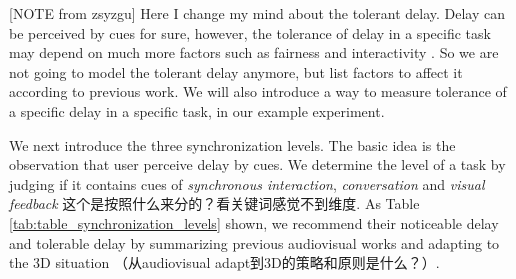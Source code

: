 [NOTE from zsyzgu] Here I change my mind about the tolerant delay. Delay can be perceived by cues for sure, however, the tolerance of delay in a specific task may depend on much more factors such as fairness and interactivity \cite{ishibashi2006subjective, montagud2012inter}. So we are not going to model the tolerant delay anymore, but list factors to affect it according to previous work. We will also introduce a way to measure tolerance of a specific delay in a specific task, in our example experiment.

We next introduce the three synchronization levels. The basic idea is the observation that user perceive delay by cues. We determine the level of a task by judging if it contains cues of \emph{synchronous interaction}, \emph{conversation} and \emph{visual feedback} 这个是按照什么来分的？看关键词感觉不到维度. As Table \ref{tab:table_synchronization_levels} shown, we recommend their noticeable delay and tolerable delay by summarizing previous audiovisual works and adapting to the 3D situation （从audiovisual adapt到3D的策略和原则是什么？）.

